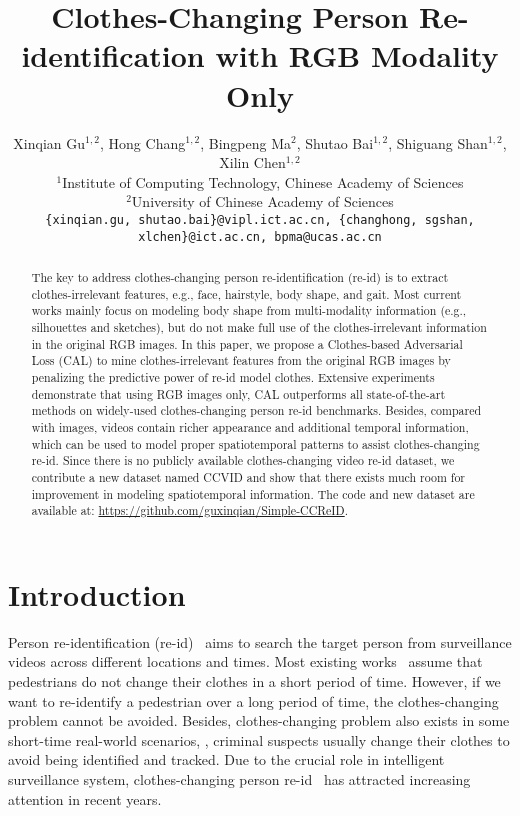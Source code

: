 \documentclass[10pt,twocolumn,letterpaper]{article}
\begin{document}
\title{Clothes-Changing Person Re-identification with RGB Modality Only}

\author{Xinqian Gu$^{1,2}$, Hong Chang$^{1,2}$, Bingpeng Ma$^{2}$, Shutao Bai$^{1,2}$, Shiguang Shan$^{1,2}$, Xilin Chen$^{1,2}$\\
$^1$Institute of Computing Technology, Chinese Academy of Sciences\\
$^2$University of Chinese Academy of Sciences\\
{\tt\small \{xinqian.gu, shutao.bai\}@vipl.ict.ac.cn, \{changhong, sgshan, xlchen\}@ict.ac.cn, bpma@ucas.ac.cn}
}

\maketitle

\begin{abstract}
	The key to address clothes-changing person re-identification (re-id) is to extract clothes-irrelevant features, e.g., face, hairstyle, body shape, and gait.
	Most current works mainly focus on modeling body shape from multi-modality information (e.g., silhouettes and sketches), but do not make full use of the clothes-irrelevant information in the original RGB images.
	In this paper, we propose a Clothes-based Adversarial Loss (CAL) to mine clothes-irrelevant features from the original RGB images by penalizing the predictive power of re-id model \wrt clothes.
	Extensive experiments demonstrate that using RGB images only, CAL outperforms all state-of-the-art methods on widely-used clothes-changing person re-id benchmarks.
	Besides, compared with images, videos contain richer appearance and additional temporal information, which can be used to model proper spatiotemporal patterns to assist clothes-changing re-id.
	Since there is no publicly available clothes-changing video re-id dataset, we contribute a new dataset named CCVID and show that there exists much room for improvement in modeling spatiotemporal information.
	The code and new dataset are available at: \url{https://github.com/guxinqian/Simple-CCReID}.
\end{abstract}

\section{Introduction}
\label{sec:intro}

Person re-identification (re-id)~\cite{Zheng2015Scalable, gu2019TKP,Hou2021FC} aims to search the target person from surveillance videos across different locations and times.
Most existing works~\cite{Sun2018Beyond,Gu2020AP3D,Hou2020TCL} assume that pedestrians do not change their clothes in a short period of time.
However, if we want to re-identify a pedestrian over a long period of time, the clothes-changing problem cannot be avoided. Besides, clothes-changing problem also exists in some short-time real-world scenarios, \eg, criminal suspects usually change their clothes to avoid being identified and tracked.
Due to the crucial role in intelligent surveillance system, clothes-changing person re-id~\cite{Yang2019PRCC, Fan2020Radio} has attracted increasing attention in recent years.
\end{document}
